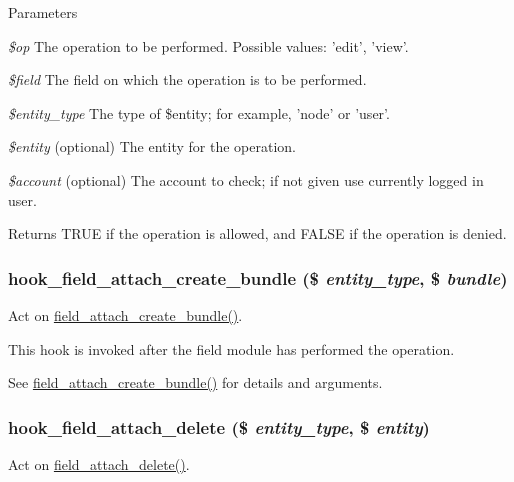 \begin{DoxyParams}{Parameters}
\item[{\em \$op}]The operation to be performed. Possible values: 'edit', 'view'. \item[{\em \$field}]The field on which the operation is to be performed. \item[{\em \$entity\_\-type}]The type of \$entity; for example, 'node' or 'user'. \item[{\em \$entity}](optional) The entity for the operation. \item[{\em \$account}](optional) The account to check; if not given use currently logged in user.\end{DoxyParams}
\begin{DoxyReturn}{Returns}
TRUE if the operation is allowed, and FALSE if the operation is denied. 
\end{DoxyReturn}
\hypertarget{group__field__attach_gad2e99b8b55c106c289a8241db00f0f30}{
\subsubsection[{hook\_\-field\_\-attach\_\-create\_\-bundle}]{\setlength{\rightskip}{0pt plus 5cm}hook\_\-field\_\-attach\_\-create\_\-bundle (\$ {\em entity\_\-type}, \/  \$ {\em bundle})}}
\label{group__field__attach_gad2e99b8b55c106c289a8241db00f0f30}
Act on \hyperlink{group__field__attach_gab3649772ef7a6416b013a4a556ce51bf}{field\_\-attach\_\-create\_\-bundle()}.

This hook is invoked after the field module has performed the operation.

See \hyperlink{group__field__attach_gab3649772ef7a6416b013a4a556ce51bf}{field\_\-attach\_\-create\_\-bundle()} for details and arguments. \hypertarget{group__field__attach_gac9e5a9e43f1290315db8b593b9516094}{
\subsubsection[{hook\_\-field\_\-attach\_\-delete}]{\setlength{\rightskip}{0pt plus 5cm}hook\_\-field\_\-attach\_\-delete (\$ {\em entity\_\-type}, \/  \$ {\em entity})}}
\label{group__field__attach_gac9e5a9e43f1290315db8b593b9516094}
Act on \hyperlink{group__field__attach_gac2e3658c9c02d0d0e71359f9ef2f207a}{field\_\-attach\_\-delete()}.

